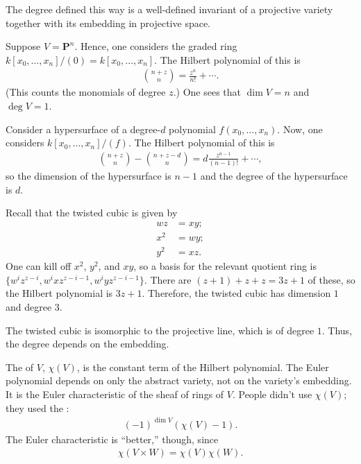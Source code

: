 \documentclass [11 pt, oneside, margin = 1 in] {article}
\begin{document}
\begin{remark}
	The degree defined this way is a well-defined invariant of a projective variety together with its embedding in projective space.
\end{remark}

\begin{example}[ ]\label{}\text{}
Suppose $V=\mathbf{P}^n$. Hence, one considers the graded ring $k[x_0,\hdots,x_n]/(0)=k[x_0,\hdots,x_n]$. The Hilbert polynomial of this is
\begin{align*}
	\binom{n+z}{n} = \frac{z^n}{n!} + \cdots.
\end{align*}
(This counts the monomials of degree $z$.) One sees that $\dim V = n$ and $\deg V = 1$. 
\end{example}

\begin{example}[ ]\label{}\text{}
Consider a hypersurface of a degree-$d$ polynomial $f(x_0,\hdots, x_n)$. Now, one considers $k[x_0,\hdots, x_n]/(f)$. The Hilbert polynomial of this is
\begin{align*}
	\binom{n+z}{n} - \binom{n+z-d}{n}  = d \frac{z^{n-1}}{(n-1)!} + \cdots,
\end{align*}
so the dimension of the hypersurface is $n-1$ and the degree of the hypersurface is $d$.
\end{example}

\begin{example}\label{}\text{}
 Recall that the twisted cubic is given by
\begin{align*}
	wz &= xy;\\
	x^2 &= wy;\\
	y^2 &= xz.
\end{align*}
One can kill off $x^2$, $y^2$, and $xy$, so a basis for the relevant quotient ring is $\{w^iz^{z- i}, w^ixz^{z- i -1}, w^iyz^{z-i-1}\}$. There are $( z+ 1)+z +  z = 3z + 1$ of these, so the Hilbert polynomial is $3z+1$. Therefore, the twisted cubic has dimension $1$ and degree $3$.
\end{example}

\begin{remark}
	The twisted cubic is isomorphic to the projective line, which is of degree $1$. Thus, the degree depends on the embedding.
\end{remark}

The  of $V$, $\chi(V)$, is the constant term of the Hilbert polynomial. The Euler polynomial depends on only the abstract variety, not on the variety's embedding. It is the Euler characteristic of the sheaf of rings of $V$. People didn't use $\chi(V)$; they used the :
\begin{align*}
	(-1)^{\dim V}  (\chi(V)-1).
\end{align*}
The Euler characteristic is ``better,'' though, since
\begin{align*}
	\chi(V\times W) = \chi (V)\chi (W).
\end{align*}
\end{document}
